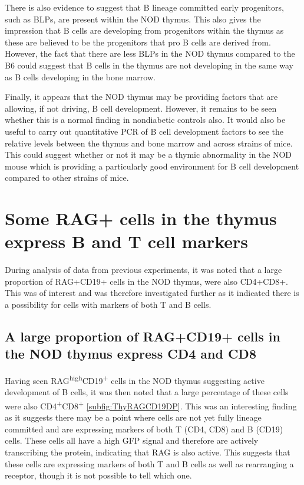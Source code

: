 There is also evidence to suggest that B lineage committed early progenitors, such as BLPs, are present within the NOD thymus. 
This also gives the impression that B cells are developing from progenitors within the thymus as these are believed to be the progenitors that pro B cells are derived from.
However, the fact that there are less BLPs in the NOD thymus compared to the B6 could suggest that B cells in the thymus are not developing in the same way as B cells developing in the bone marrow.

Finally, it appears that the NOD thymus may be providing factors that are allowing, if not driving, B cell development.
However, it remains to be seen whether this is a normal finding in nondiabetic controls also.
It would also be useful to carry out quantitative PCR of B cell development factors to see the relative levels between the thymus and bone marrow and across strains of mice.
This could suggest whether or not it may be a thymic abnormality in the NOD mouse which is providing a particularly good environment for B cell development compared to other strains of mice.

\section{Some RAG+ cells in the thymus express B and T cell markers}
During analysis of data from previous experiments, it was noted that a large proportion of RAG+CD19+ cells in the NOD thymus, were also CD4+CD8+.
This was of interest and was therefore investigated further as it indicated there is a possibility for cells with markers of both T and B cells.

\subsection{A large proportion of RAG+CD19+ cells in the NOD thymus express CD4 and CD8}

Having seen RAG\textsuperscript{high}CD19\textsuperscript{+} cells in the NOD thymus suggesting active development of B cells, it was then noted that a large percentage of these cells were also CD4\textsuperscript{+}CD8\textsuperscript{+} \cref{subfig:ThyRAGCD19DP}.
This was an interesting finding as it suggests there may be a point where cells are not yet fully lineage committed and are expressing markers of both T (CD4, CD8) and B (CD19) cells.
These cells all have a high GFP signal and therefore are actively transcribing the protein, indicating that RAG is also active.
This suggests that these cells are expressing markers of both T and B cells as well as rearranging a receptor, though it is not possible to tell which one.

